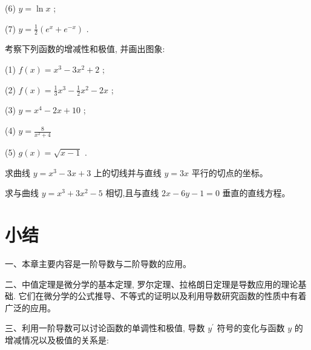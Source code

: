 \documentclass[lang=cn,newtx,10pt,scheme=chinese]{elegantbook}
\begin{document}
\begin{problemset}[习 题 十 二]
(6) \(y = \ln x\) ;

(7) \(y = \frac{1}{2}\left( {{e}^{x} + {e}^{-x}}\right)\) .

\item 考察下列函数的增减性和极值, 并画出图象:

(1) \(f\left( x\right) = {x}^{3} - 3{x}^{2} + 2\) ;

(2) \(f\left( x\right) = \frac{1}{3}{x}^{3} - \frac{1}{2}{x}^{2} - {2x}\) ;

(3) \(y = {x}^{4} - {2x} + {10}\) ;

(4) \(y = \frac{8}{{x}^{2} + 4}\)

(5) \(g\left( x\right) = \sqrt{x - 1}\) .

\item 求曲线 \(y = {x}^{3} - {3x} + 3\) 上的切线并与直线 \(y = {3x}\) 平行的切点的坐标。

\item 求与曲线 \(y = {x}^{3} + 3{x}^{2} - 5\) 相切,且与直线 \({2x} - {6y} - 1 = 0\) 垂直的直线方程。

\end{problemset}

\chapter*{小结}

一、本章主要内容是一阶导数与二阶导数的应用。

二、中值定理是微分学的基本定理, 罗尔定理、拉格朗日定理是导数应用的理论基础. 它们在微分学的公式推导、不等式的证明以及利用导数研究函数的性质中有着广泛的应用。

三、利用一阶导数可以讨论函数的单调性和极值, 导数 \({y}^{\prime }\) 符号的变化与函数 \(y\) 的增减情况以及极值的关系是:

\begin{center}
\end{center}
\end{document}
